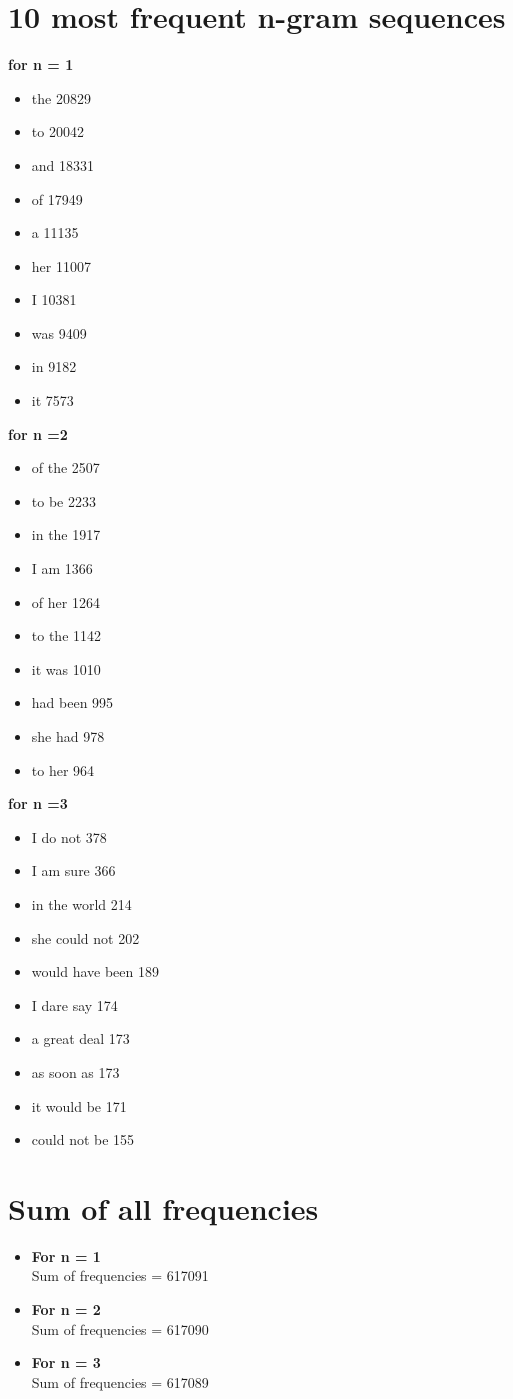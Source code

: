 \documentclass[final,12pt]{elsarticle}
\begin{document}
\section{10 most frequent n-gram sequences}
\textbf{for n = 1}
\begin{itemize}
\item the 20829
\item to 20042
\item and 18331 
\item of 17949
\item a 11135
\item her 11007
\item I 10381
\item was 9409
\item in 9182 
\item it 7573
\end{itemize}

\textbf{for n =2}
\begin{itemize}
\item of the 2507
\item to be 2233
\item in the 1917
\item I am 1366
\item of her 1264
\item to the 1142
\item it was 1010
\item had been 995
\item she had 978
\item to her 964
\end{itemize}

\textbf{for n =3}
\begin{itemize}
\item I do not 378
\item I am sure 366
\item in the world 214
\item she could not 202
\item would have been 189
\item I dare say 174
\item a great deal 173
\item as soon as 173
\item it would be 171
\item could not be 155
\end{itemize}
\section{Sum of all frequencies}
\begin{itemize}
\item \textbf{For n = 1}\\
Sum of frequencies = 617091
\item \textbf{For n = 2}\\
Sum of frequencies = 617090
\item \textbf{For n = 3}\\
Sum of frequencies = 617089
\end{itemize}
\end{document}
